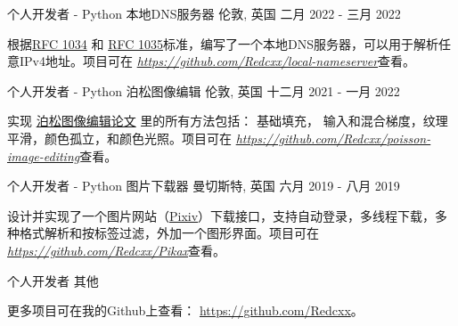 \begin{cventries}
  \cventry
    {个人开发者 - Python} %
    {本地DNS服务器} %
    {伦敦, 英国} %
    {二月 2022 - 三月 2022} %
    {
      \begin{cvitems} %
        \item {根据\href{https://datatracker.ietf.org/doc/html/rfc1034}{RFC 1034} 和 \href{https://datatracker.ietf.org/doc/html/rfc1035}{RFC 1035}标准，编写了一个本地DNS服务器，可以用于解析任意IPv4地址。项目可在 \href{https://github.com/Redcxx/local-nameserver}{\textit{https://github.com/Redcxx/local-nameserver}}查看。}
      \end{cvitems}
    }
    
  \cventry
    {个人开发者 - Python} %
    {泊松图像编辑} %
    {伦敦, 英国} %
    {十二月 2021 - 一月 2022} %
    {
      \begin{cvitems} %
        \item {实现 \href{https://www.cs.jhu.edu/~misha/Fall07/Papers/Perez03.pdf}{泊松图像编辑论文} 里的所有方法包括： 基础填充， 输入和混合梯度，纹理平滑，颜色孤立，和颜色光照。项目可在 \href{https://github.com/Redcxx/poisson-image-editing}{\textit{https://github.com/Redcxx/poisson-image-editing}}查看。}
      \end{cvitems}
    }

  \cventry
    {个人开发者 - Python} %
    {图片下载器} %
    {曼切斯特, 英国} %
    {六月 2019 - 八月 2019} %
    {
      \begin{cvitems} %
        \item {设计并实现了一个图片网站（\href{https://www.pixiv.net/}{Pixiv}）下载接口，支持自动登录，多线程下载，多种格式解析和按标签过滤，外加一个图形界面。项目可在 \href{https://github.com/Redcxx/Pikax}{\textit{https://github.com/Redcxx/Pikax}}查看。}
      \end{cvitems}
    }
    
  \cventry
    {个人开发者} %
    {其他} %
    {} %
    {} %
    {
      \begin{cvitems} %
        \item {更多项目可在我的Github上查看： \href{https://github.com/Redcxx}{https://github.com/Redcxx}。}
      \end{cvitems}
    }
  
    


\end{cventries}
